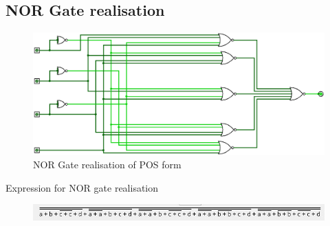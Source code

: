 \documentclass[12pt]{article}
\begin{document}
\subsection*{NOR Gate realisation}
\begin{center}
    \begin{figure}[ht]
        \includegraphics[scale=0.40]{POS_NOR.png}
        \caption{NOR Gate realisation of POS form}
    \end{figure}
\end{center}
\begin{center}
    Expression for NOR gate realisation
    \begin{figure}[ht]
        \includegraphics{POS_NOR_exp.jpg}
    \end{figure}
\end{center}
\end{document}

